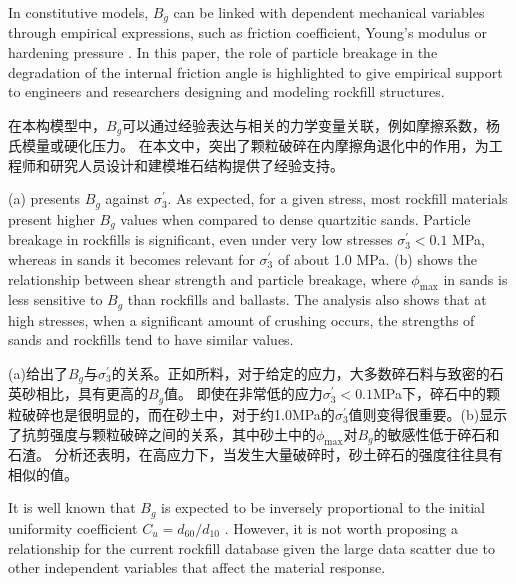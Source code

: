 \begin{ParaColumn}
    \switchcolumn*

    In constitutive models, $B_g$ can be linked with dependent mechanical variables through empirical expressions, such as friction coefficient, Young’s modulus or hardening pressure \citep{Yin2017,Ovalle2020487}. In this paper, the role of particle breakage in the degradation of the internal friction angle is highlighted to give empirical support to engineers and researchers designing and modeling rockfill structures.

    \switchcolumn

    在本构模型中，$B_g$可以通过经验表达与相关的力学变量关联，例如摩擦系数，杨氏模量或硬化压力\citep{Yin2017,Ovalle2020487}。 在本文中，突出了颗粒破碎在内摩擦角退化中的作用，为工程师和研究人员设计和建模堆石结构提供了经验支持。

    \switchcolumn*

    (a) presents $B_g$ against $\sigma_3^\prime$. As expected, for a given stress, most rockfill materials present higher $B_g$ values when compared to dense quartzitic sands. Particle breakage in rockfills is significant, even under very low stresses $\sigma_3^\prime<0.1$ MPa, whereas in sands it becomes relevant for $\sigma_3^\prime$ of about 1.0 MPa. (b) shows the relationship between shear strength and particle breakage, where $\phi_{\max}$ in sands is less sensitive to $B_g$ than rockfills and ballasts. The analysis also shows that at high stresses, when a significant amount of crushing occurs, the strengths of sands and rockfills tend to have similar values.

    \switchcolumn

    (a)给出了$B_g$与$\sigma_3^\prime$的关系。正如所料，对于给定的应力，大多数碎石料与致密的石英砂相比，具有更高的$B_g$值。 即使在非常低的应力$\sigma_3^\prime<0.1$MPa下，碎石中的颗粒破碎也是很明显的，而在砂土中，对于约1.0MPa的$\sigma_3^\prime$值则变得很重要。(b)显示了抗剪强度与颗粒破碎之间的关系，其中砂土中的$\phi_{\max}$对$B_g$的敏感性低于碎石和石渣。 分析还表明，在高应力下，当发生大量破碎时，砂土碎石的强度往往具有相似的值。

    \CrossColumnText{
        
    }

    \switchcolumn*

    It is well known that $B_g$ is expected to be inversely proportional to the initial uniformity coefficient $C_u=d_{60}/d_{10}$ \citep{Hardin19851177,Ovalle20162383}. However, it is not worth proposing a relationship for the current rockfill database given the large data scatter due to other independent variables that affect the material response.


\end{ParaColumn}
